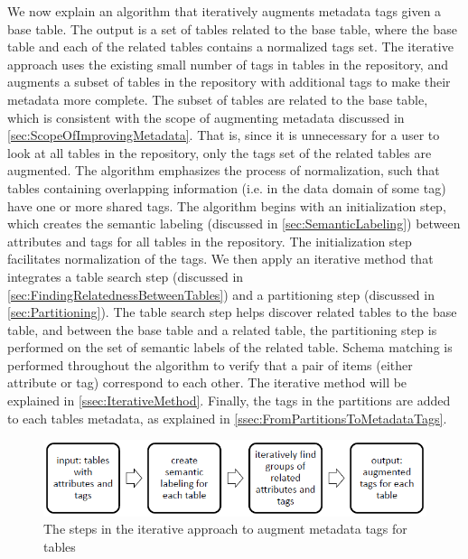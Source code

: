 We now explain an algorithm that iteratively augments metadata tags given a base table. The output is a set of tables related to the base table, where the base table and each of the related tables contains a normalized tags set. The iterative approach uses the existing small number of tags in tables in the repository, and augments a subset of tables in the repository with additional tags to make their metadata more complete. The subset of tables are related to the base table, which is consistent with the scope of augmenting metadata discussed in \autoref{sec:ScopeOfImprovingMetadata}. That is, since it is unnecessary for a user to look at all tables in the repository, only the tags set of the related tables are augmented. The algorithm emphasizes the process of normalization, such that tables containing overlapping information (i.e. in the data domain of some tag) have one or more shared tags.
The algorithm begins with an initialization step, which creates the semantic labeling (discussed in \autoref{sec:SemanticLabeling}) between attributes and tags for all tables in the repository. The initialization step facilitates normalization of the tags. We then apply an iterative method that integrates a table search step (discussed in \autoref{sec:FindingRelatednessBetweenTables}) and a partitioning step (discussed in \autoref{sec:Partitioning}). The table search step helps discover related tables to the base table, and between the base table and a related table, the partitioning step is performed on the set of semantic labels of the related table. Schema matching is performed throughout the algorithm to verify that a pair of items (either attribute or tag) correspond to each other. The iterative method will be explained in \autoref{ssec:IterativeMethod}. Finally, the tags in the partitions are added to each tables metadata, as explained in \autoref{ssec:FromPartitionsToMetadataTags}.

\begin{figure}
    \centering
    \includegraphics[width=5in]{figures/the-steps-iterative-approach.png}
    \caption{The steps in the iterative approach to augment metadata tags for tables}
    \label{fig:the-steps-iterative-approach}
\end{figure}

